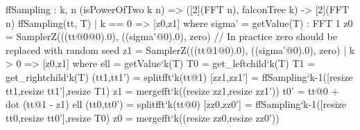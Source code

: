  \begin{algorithm}[!htb]
  \caption{$\ffsampling_{\ n}(\vect, \tree)$}\label{alg:ffsampling}
 \begin{algorithmic}[1]
  \label{line:samplerz0}
  \label{line:samplerz1}
  \EndIf
  \end{algorithmic}
 \end{algorithm}

\begin{code}
  ffSampling : {k, n} (isPowerOfTwo k n) =>
    ([2](FFT n), falconTree k) -> [2](FFT n)
  ffSampling(tt, T)
    | k == 0 => [z0,z1] where
        sigma' = getValue(T) : FFT 1
        z0 = SamplerZ(((tt@0@0).0), ((sigma'@0).0), zero) 
        // In practice zero should be replaced with random seed
        z1 = SamplerZ(((tt@1@0).0), ((sigma'@0).0), zero)
    | k >  0 => [z0,z1] where
        ell = getValue`{k}(T)
        T0 = get_leftchild`{k}(T)
        T1 = get_rightchild`{k}(T)
        (tt1,tt1') = splitfft`{k}(tt@1)
        [zz1,zz1'] = ffSampling`{k-1}([resize tt1,resize tt1'],resize T1)
        z1 = mergefft`{k}((resize zz1,resize zz1'))
        t0' = tt@0 + dot (tt@1 - z1) ell
        (tt0,tt0') = splitfft`{k}(tt@0)
        [zz0,zz0'] = ffSampling`{k-1}([resize tt0,resize tt0'],resize T0)
        z0 = mergefft`{k}((resize zz0,resize zz0'))
\end{code}

